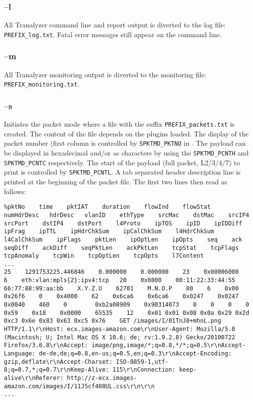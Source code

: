 \subsubsection{--l}\label{t2-loption}
All Tranalyzer command line and report output is diverted to the log file: {\tt PREFIX\_log.txt}.
Fatal error messages still appear on the command line.

\subsubsection{--m}
All Tranalyzer monitoring output is diverted to the monitoring file: {\tt PREFIX\_monitoring.txt}.

\subsubsection{--s}
Initiates the packet mode where a file with the suffix {\tt PREFIX\_packets.txt} is created.
The content of the file depends on the plugins loaded.
The display of the packet number (first column is controlled by {\tt SPKTMD\_PKTNO} in .
The payload can be displayed in hexadecimal and/or as characters by using the {\tt SPKTMD\_PCNTH} and {\tt SPKTMD\_PCNTC} respectively.
The start of the payload (full packet, L2/3/4/7) to print is controlled by {\tt SPKTMD\_PCNTL}.
A tab separated header description line is printed at the beginning of the packet file.
The first two lines then read as follows:

\begin{center}
\begin{scriptsize}
\begin{lstlisting}
%pktNo    time    pktIAT    duration    flowInd    flowStat    numHdrDesc   hdrDesc   vlanID    ethType    srcMac    dstMac    srcIP4    srcPort    dstIP4    dstPort    l4Proto    ipTOS    ipID    ipIDDiff    ipFrag    ipTTL    ipHdrChkSum    ipCalChkSum    l4HdrChkSum    l4CalChkSum    ipFlags    pktLen    ipOptLen    ipOpts    seq    ack    seqDiff    ackDiff    seqPktLen    ackPktLen    tcpStat    tcpFlags    tcpAnomaly    tcpWin    tcpOptLen    tcpOpts    l7Content
...
25    1291753225.446846    0.000000    0.000000    23    0x00006000   6    eth:vlan:mpls{2}:ipv4:tcp   20    0x0800    00:11:22:33:44:55    66:77:88:99:aa:bb    X.Y.Z.U    62701    M.N.O.P    80    6    0x00    0x26f6    0    0x4000    62    0x6ca6    0x6ca6    0x0247    0x0247    0x0040    460    0        0xb2a08909    0x90314073    0    0    0    0    0x59    0x18    0x0000    65535    12    0x01 0x01 0x08 0x0a 0x29 0x2d 0xc3 0x6e 0x83 0x63 0xc5 0x76    GET /images/I/01TnJ0+mhnL.png HTTP/1.1\r\nHost: ecx.images-amazon.com\r\nUser-Agent: Mozilla/5.0 (Macintosh; U; Intel Mac OS X 10.6; de; rv:1.9.2.8) Gecko/20100722 Firefox/3.6.8\r\nAccept: image/png,image/*;q=0.8,*/*;q=0.5\r\nAccept-Language: de-de,de;q=0.8,en-us;q=0.5,en;q=0.3\r\nAccept-Encoding: gzip,deflate\r\nAccept-Charset: ISO-8859-1,utf-8;q=0.7,*;q=0.7\r\nKeep-Alive: 115\r\nConnection: keep-alive\r\nReferer: http://z-ecx.images-amazon.com/images/I/11J5cf408UL.css\r\n\r\n
...
\end{lstlisting}
\end{scriptsize}
\end{center}

